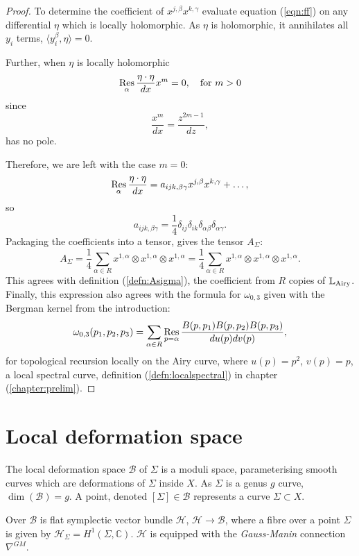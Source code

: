 \begin{proof}
    To determine the coefficient of \(x^{j,\beta} x^{k,\gamma}\) evaluate equation (\ref{eqn:ff}) on any differential \(\eta\) which is locally holomorphic. As \(\eta\) is holomorphic, it annihilates all \(y_i\) terms,  \( \langle y_i^\beta,\eta\rangle=0\). 
    
    Further, when \(\eta\) is locally holomorphic
    \[\operatorname*{Res}_\alpha\frac{\eta\cdot\eta }{dx}x^m=0,\quad \text{for }m>0
    \]
    since 
    \[ \frac{x^m}{dx}=\frac{z^{2m-1}}{dz},\]
    has no pole.  
    
    Therefore, we are left with the case \(m=0\):
    \[\operatorname*{Res}_\alpha\frac{\eta\cdot\eta }{dx}=a_{ijk,\beta\gamma} x^{j,\beta} x^{k,\gamma}+ \dots ,
    \]
    so 
    \[ a_{ijk,\beta\gamma}= \frac{1}{4} \delta_{ij}\delta_{ik}\delta_{\alpha\beta}\delta_{\alpha\gamma}.\]
    Packaging the coefficients into a tensor, gives the tensor \(A_\Sigma\):
    \[ A_\Sigma=\frac{1}{4} \sum_{\alpha \in R} x^{1,\alpha} \otimes x^{1,\alpha} \otimes x^{1,\alpha} = \frac{1}{4} \sum_{\alpha \in R} x^{1,\alpha} \otimes  x^{1,\alpha} \otimes  x^{1,\alpha}.  \] 
    This agrees with definition (\ref{defn:Asigma}), the coefficient from \(R\) copies of \( \mathbb{L}_{\mathrm{Airy}}\). Finally, this expression also agrees with the formula for \(\omega_{0,3}\) given with the Bergman kernel from the introduction:
    \[\omega_{0,3}(p_1,p_2,p_3)=\sum_{\alpha \in R} \operatorname*{Res}_{p=\alpha}\frac{B(p,p_1)B(p,p_2)B(p,p_3)}{du(p)dv(p)},
    \]
    for topological recursion locally on the Airy curve, where \(u(p)=p^2\), \(v(p)=p\), a local spectral curve, definition (\ref{defn:localspectral}) in chapter (\ref{chapter:prelim}).
    \end{proof}

    

    \section{Local deformation space}
    
    The local deformation space \( \mathcal{B}\) of \( \Sigma\) is a moduli space, parameterising smooth curves which are deformations of  \( \Sigma \) inside \(X\). As \(\Sigma\) is a genus \(g\) curve, \( \dim( \mathcal{B}) = g\). A point, denoted \( [\Sigma] \in \mathcal{B}\) represents a curve \( \Sigma \subset X\).  
    
    Over \( \mathcal{B}\) is flat symplectic vector bundle \( \mathcal{H}\),  \( \mathcal{H} \rightarrow \mathcal{B}\), where a fibre over a point \( \Sigma\) is given by \( \mathcal{H}_\Sigma =  H^1(\Sigma, \mathbb{C})\). \( \mathcal{H}\) is equipped with the \emph{Gauss-Manin} connection \( \nabla^{GM}\). 
    
